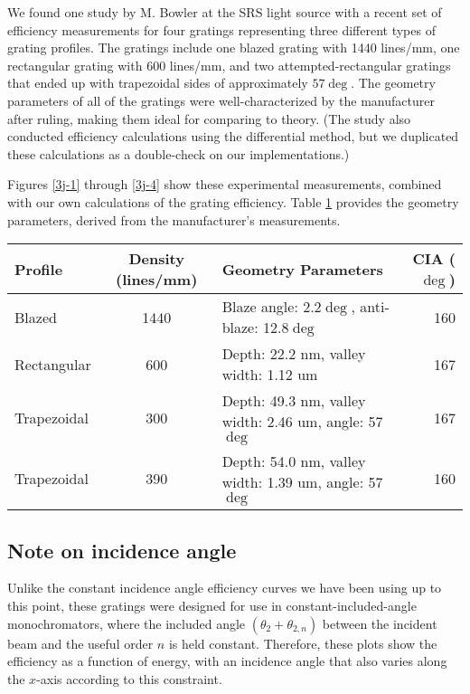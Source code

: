  We found one study by M. Bowler at the SRS light source \cite{Bow01} with a recent set of efficiency measurements for four gratings representing three different types of grating profiles.  The gratings include one blazed grating with 1440 lines/mm, one rectangular grating with 600 lines/mm, and two attempted-rectangular gratings that ended up with trapezoidal sides of approximately $57\deg$.  The geometry parameters of all of the gratings were well-characterized by the manufacturer after ruling, making them ideal for comparing to theory.  (The study also conducted efficiency calculations using the differential method, but we duplicated these calculations as a double-check on our implementations.)

Figures \ref{3j-1} through \ref{3j-4} show these experimental measurements, combined with our own calculations of the grating efficiency.  Table \ref{3j-table} provides the geometry parameters, derived from the manufacturer's measurements.

\begin{table}[htbp]
\centering
{}
{\footnotesize
\begin{tabularx}{\textwidth}{@{} l c l r @{}} %
\toprule
Profile    &  Density (lines/mm)& Geometry Parameters & CIA ($\deg$)\\
\midrule
Blazed & 1440 & Blaze angle: 2.2$\deg$, anti-blaze: 12.8$\deg$ & 160 \\
Rectangular & 600 & Depth: 22.2 nm, valley width: 1.12 um & 167 \\
Trapezoidal & 300 & Depth: 49.3 nm, valley width: 2.46 um, angle: 57$\deg$ & 167\\
Trapezoidal & 390 & Depth: 54.0 nm, valley width: 1.39 um, angle: 57$\deg$ & 160\\
\bottomrule
\end{tabularx}
}
\label{3j-table}
\end{table}

\subsection{Note on incidence angle}
Unlike the constant incidence angle efficiency curves we have been using up to this point, these gratings were designed for use in constant-included-angle monochromators, where the included angle $(\theta_2 + \theta_{2,n})$ between the incident beam and the useful order $n$ is held constant.  
Therefore, these plots show the efficiency as a function of energy, with an incidence angle that also varies along the $x$-axis according to this constraint.

